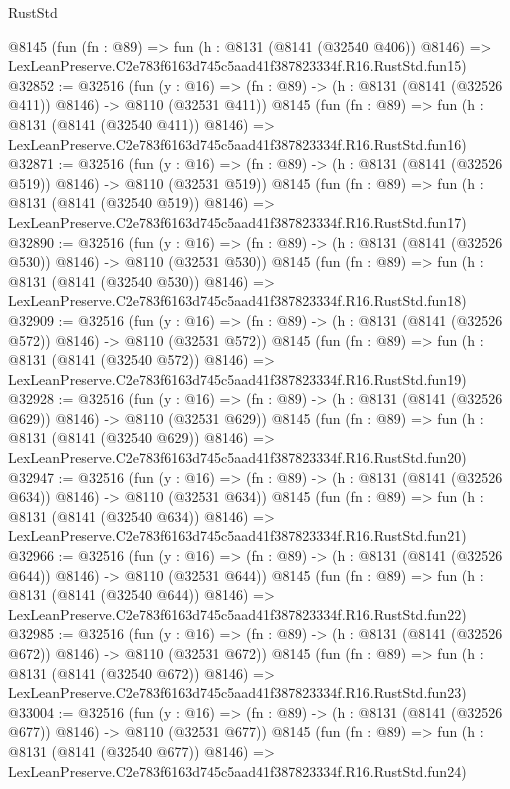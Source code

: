 \begin{lexlean}{RustStd}
\begin{coremodule}
    @8145
    (fun (fn : @89) =>
    fun (h : @8131 (@8141 (@32540 @406)) @8146) =>
    LexLeanPreserve.C2e783f6163d745c5aad41f387823334f.R16.RustStd.fun15)
@32852 := @32516
    (fun (y : @16) => (fn : @89) -> (h : @8131 (@8141 (@32526 @411)) @8146) -> @8110 (@32531 @411))
    @8145
    (fun (fn : @89) =>
    fun (h : @8131 (@8141 (@32540 @411)) @8146) =>
    LexLeanPreserve.C2e783f6163d745c5aad41f387823334f.R16.RustStd.fun16)
@32871 := @32516
    (fun (y : @16) => (fn : @89) -> (h : @8131 (@8141 (@32526 @519)) @8146) -> @8110 (@32531 @519))
    @8145
    (fun (fn : @89) =>
    fun (h : @8131 (@8141 (@32540 @519)) @8146) =>
    LexLeanPreserve.C2e783f6163d745c5aad41f387823334f.R16.RustStd.fun17)
@32890 := @32516
    (fun (y : @16) => (fn : @89) -> (h : @8131 (@8141 (@32526 @530)) @8146) -> @8110 (@32531 @530))
    @8145
    (fun (fn : @89) =>
    fun (h : @8131 (@8141 (@32540 @530)) @8146) =>
    LexLeanPreserve.C2e783f6163d745c5aad41f387823334f.R16.RustStd.fun18)
@32909 := @32516
    (fun (y : @16) => (fn : @89) -> (h : @8131 (@8141 (@32526 @572)) @8146) -> @8110 (@32531 @572))
    @8145
    (fun (fn : @89) =>
    fun (h : @8131 (@8141 (@32540 @572)) @8146) =>
    LexLeanPreserve.C2e783f6163d745c5aad41f387823334f.R16.RustStd.fun19)
@32928 := @32516
    (fun (y : @16) => (fn : @89) -> (h : @8131 (@8141 (@32526 @629)) @8146) -> @8110 (@32531 @629))
    @8145
    (fun (fn : @89) =>
    fun (h : @8131 (@8141 (@32540 @629)) @8146) =>
    LexLeanPreserve.C2e783f6163d745c5aad41f387823334f.R16.RustStd.fun20)
@32947 := @32516
    (fun (y : @16) => (fn : @89) -> (h : @8131 (@8141 (@32526 @634)) @8146) -> @8110 (@32531 @634))
    @8145
    (fun (fn : @89) =>
    fun (h : @8131 (@8141 (@32540 @634)) @8146) =>
    LexLeanPreserve.C2e783f6163d745c5aad41f387823334f.R16.RustStd.fun21)
@32966 := @32516
    (fun (y : @16) => (fn : @89) -> (h : @8131 (@8141 (@32526 @644)) @8146) -> @8110 (@32531 @644))
    @8145
    (fun (fn : @89) =>
    fun (h : @8131 (@8141 (@32540 @644)) @8146) =>
    LexLeanPreserve.C2e783f6163d745c5aad41f387823334f.R16.RustStd.fun22)
@32985 := @32516
    (fun (y : @16) => (fn : @89) -> (h : @8131 (@8141 (@32526 @672)) @8146) -> @8110 (@32531 @672))
    @8145
    (fun (fn : @89) =>
    fun (h : @8131 (@8141 (@32540 @672)) @8146) =>
    LexLeanPreserve.C2e783f6163d745c5aad41f387823334f.R16.RustStd.fun23)
@33004 := @32516
    (fun (y : @16) => (fn : @89) -> (h : @8131 (@8141 (@32526 @677)) @8146) -> @8110 (@32531 @677))
    @8145
    (fun (fn : @89) =>
    fun (h : @8131 (@8141 (@32540 @677)) @8146) =>
    LexLeanPreserve.C2e783f6163d745c5aad41f387823334f.R16.RustStd.fun24)

\end{coremodule}
\end{lexlean}
